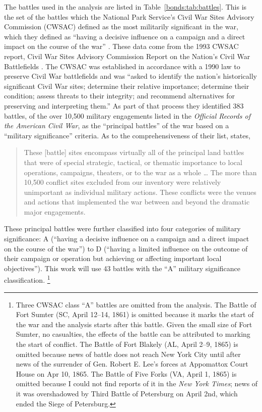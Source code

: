 The battles used in the analysis are listed in Table~\ref{bonds:tab:battles}.
This is the set of the battles which the National Park Service's Civil War Sites Advisory Commission (CWSAC) defined as the most militarily significant in the war, which they defined as ``having a decisive influence on a campaign and a direct impact on the course of the war'' \parencite{CWSAC1993}.
These data come from the 1993 CWSAC report, Civil War Sites Advisory Commission Report on the Nation's Civil War Battlefields \parencites{CWSAC1993}{CWSAC1993b}.
The CWSAC was established in accordance with a 1990 law to preserve Civil War battlefields and was ``asked to identify the nation's historically significant Civil War sites; determine their relative importance; determine their condition; assess threats to their integrity; and recommend alternatives for preserving and interpreting them.'' \parencite{CWSAC1993b}
As part of that process they identified 383 battles, of the over 10,500 military engagements listed in the \textit{Official Records of the American Civil War}, as the ``principal battles'' of the war based on a ``military significance'' criteria.
As to the comprehensiveness of their list, \parencite{CWSAC1993} states,
\begin{quote}
  These [battle] sites encompass virtually all of the principal land battles that were of special strategic, tactical, or thematic importance to local operations, campaigns, theaters, or to the war as a whole \dots{}
  The more than 10,500 conflict sites excluded from our inventory were relatively unimportant as individual military actions.
  These conflicts were the venues and actions that implemented the war between and beyond the dramatic major engagements.
\end{quote}
These principal battles were further classified into four categories of military significance: A (``having a decisive influence on a campaign and a direct impact on the course of the war'') to D (``having a limited influence on the outcome of their campaign or operation but achieving or affecting important local objectives'').
This work will use  43 battles with the ``A'' military significance classification.%
\footnote{
  Three CWSAC class ``A'' battles are omitted from the analysis.
  The Battle of Fort Sumter (SC, April 12--14, 1861) is omitted because it marks the start of the war and the analysis starts after this battle.
  Given the small size of Fort Sumter, no casualties, the effects of the battle can be attributed to marking the start of conflict.
  The Battle of Fort Blakely (AL, April 2--9, 1865) is omitted because news of battle does not reach New York City until after news of the surrender of Gen. Robert E. Lee's forces at Appomattox Court House on Apr 10, 1865.
  The Battle of Five Forks (VA, April 1, 1865) is omitted because I could not find reports of it in the \textit{New York Times}; news of it was overshadowed by Third Battle of Petersburg on April 2nd, which ended the Siege of Petersburg.
}
